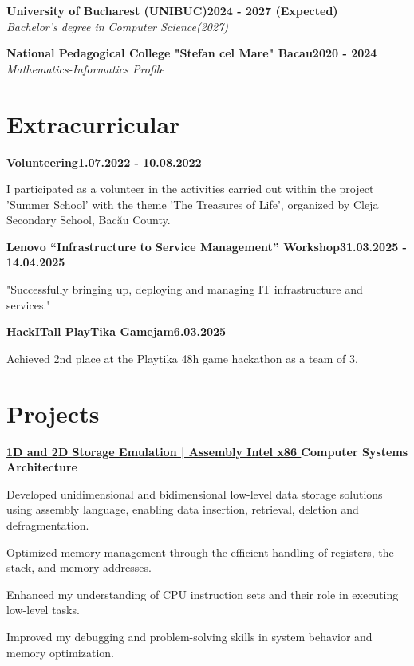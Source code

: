 \documentclass[letterpaper,10pt]{article}
\newcommand{\heading}[2]{
  \hspace{10pt}#1\hfill#2\\
}
\newcommand{\headingBf}[2]{
  \heading{\textbf{#1}}{\textbf{#2}}
}
\newcommand{\headingIt}[2]{
  \heading{\textit{#1}}{\textit{#2}}
}
\newenvironment{resume_list}{
  \vspace{-7pt}
  \begin{itemize}[itemsep=-2px, parsep=1pt, leftmargin=30pt]
}{
  \end{itemize}
}
\begin{document}
  \headingBf{University of Bucharest (UNIBUC)}{2024 - 2027 (Expected)} %
  \headingIt{Bachelor's degree in Computer Science(2027)}{}
  \vspace{0.06in}
  \headingBf{National Pedagogical College "Stefan cel Mare" Bacau}{2020 - 2024} %
  \headingIt{Mathematics-Informatics Profile}{}



  \section{Extracurricular}
    \headingBf{Volunteering}{1.07.2022 - 10.08.2022}
      \begin{resume_list}
      \item{I participated as a volunteer in the activities carried out within the project 'Summer School' with the theme 'The Treasures of Life', organized by Cleja Secondary School, Bacău County.}
      \end{resume_list}
    \headingBf{Lenovo “Infrastructure to Service Management” Workshop}{31.03.2025 - 14.04.2025}
      \begin{resume_list}
      \item{"Successfully bringing up, deploying and managing IT infrastructure and services."}
      \end{resume_list}
    \headingBf{HackITall PlayTika Gamejam}{6.03.2025}
      \begin{resume_list}
      \item{Achieved 2nd place at the Playtika 48h game hackathon as a team of 3.}
      \end{resume_list}
    

 
 \section{Projects}

  \headingBf{\href{https://github.com/denis0bej/asc-cdgds}{1D and 2D Storage Emulation | Assembly Intel x86 \faGithub}}{Computer Systems Architecture}
  \begin{resume_list}
    \item Developed unidimensional and bidimensional low-level data storage solutions using assembly language, enabling data insertion, retrieval, deletion and defragmentation. 
    \item Optimized memory management through the efficient handling of registers, the stack, and memory addresses.
    \item Enhanced my understanding of CPU instruction sets and their role in executing low-level tasks.
    \item Improved my debugging and problem-solving skills in system behavior and memory optimization.
  \end{resume_list}
\end{document}
